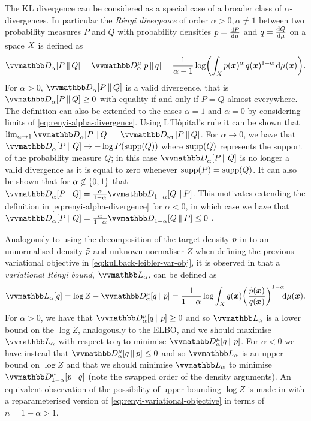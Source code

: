 The \ac{KL} divergence can be considered as a special case of a broader class of $\alpha$-divergences. In particular the \emph{R\'{e}nyi divergence} \citep{renyi1961measures,van2014renyi} of order $\alpha > 0, \alpha \neq 1$ between two probability measures $P$ and $Q$ with probability densities $p = \frac{\mathrm{d} P}{\mathrm{d} \mu}$ and $q = \frac{\mathrm{d} Q}{\mathrm{d} \mu}$ on a space $\mathit{X}$ is defined as
\begin{equation}\label{eq:renyi-alpha-divergence}
  \rdiv{\alpha}{P}{Q} =
  \rdiv[\mu]{\alpha}{p}{q} =
  \frac{1}{\alpha -1} \log \lpa \int_{\set{X}} p(\vct{x})^\alpha\,q(\vct{x})^{1-\alpha}\,\dr\mu(\vct{x})\rpa.
\end{equation}
For $\alpha > 0$, $\rdiv{\alpha}{P}{Q}$ is a valid divergence, that is $\rdiv{\alpha}{P}{Q} \geq 0$ with equality if and only if $P = Q$ almost everywhere. The definition can also be extended to the cases $\alpha = 1$ and $\alpha=0$ by considering limits of \eqref{eq:renyi-alpha-divergence}. Using L'H\^{o}pital's rule it can be shown that $\lim_{\alpha \to 1} \rdiv{\alpha}{P}{Q} = \kldiv{P}{Q}$. For $\alpha \to 0$, we have that $\rdiv{\alpha}{P}{Q} \to -\log P\lpa\support(Q)\rpa$ where $\operatorname{supp}(Q)$ represents the support of the probability measure $Q$; in this case $\rdiv{\alpha}{P}{Q}$ is no longer a valid divergence as it is equal to zero whenever $\operatorname{supp}(P) = \operatorname{supp}(Q)$. It can also be shown that for $\alpha \not\in \fset{0,1}$ that $\rdiv{\alpha}{P}{Q} = \frac{\alpha}{1-\alpha}\rdiv{1-\alpha}{Q}{P}$. This motivates extending the definition in \eqref{eq:renyi-alpha-divergence} for $\alpha < 0$, in which case we have that $\rdiv{\alpha}{P}{Q} = \frac{\alpha}{1-\alpha}\rdiv{1-\alpha}{Q}{P} \leq 0$ \citep{li2016renyi}.

Analogously to using the decomposition of the target density $p$ in to an unnormalised density $\tilde{p}$ and unknown normaliser $Z$ when defining the previous variational objective in \eqref{eq:kullback-leibler-var-obj}, it is observed in \citep{li2016renyi} that a \emph{variational R\'{e}nyi bound}, $\varobj_{\alpha}$, can be defined as
\begin{equation}\label{eq:renyi-variational-objective}
\begin{split}
  \varobj_{\alpha}\lsb q \rsb
  = 
  \log Z - \rdiv[\mu]{\alpha}{q}{\tgtdens}
  =
  \frac{1}{1-\alpha} 
  \log \int_{\set{X}} q(\vct{x}) \lpa \frac{\utgtdens(\vct{x})}{q(\vct{x})}\rpa^{1-\alpha} \kern-3pt\dr\mu(\vct{x}).
\end{split}
\end{equation}
For $\alpha > 0$, we have that $\rdiv[\mu]{\alpha}{q}{\tgtdens} \geq 0$ and so $\varobj_\alpha$ is a lower bound on the $\log Z$, analogously to the \ac{ELBO}, and we should maximise $\varobj_\alpha$ with respect to $q$ to minimise $\rdiv[\mu]{\alpha}{q}{\tgtdens}$. For $\alpha < 0$ we have instead that $\rdiv[\mu]{\alpha}{q}{\tgtdens} \leq 0$ and so $\varobj_{\alpha}$ is an upper bound on $\log Z$ and that we should minimise $\varobj_\alpha$ to minimise $\rdiv[\mu]{1-\alpha}{\tgtdens}{q}$ (note the swapped order of the density arguments). An equivalent observation of the possibility of upper bounding $\log Z$ is made in \citep{dieng2016chi} with a reparameterised version of \eqref{eq:renyi-variational-objective} in terms of $n=1-\alpha > 1$.

